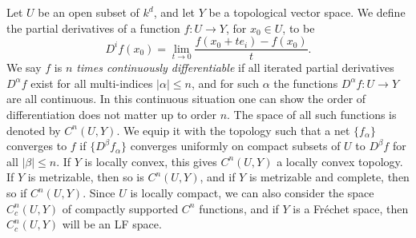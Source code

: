 Let $U$ be an open subset of $k^d$, and let $Y$ be a topological vector space. We define the partial derivatives of a function $f: U \to Y$, for $x_0 \in U$, to be
%
\[ D^i f(x_0) = \lim_{t \to 0} \frac{f(x_0 + t e_i) - f(x_0)}{t}. \]
%
We say $f$ is \emph{$n$ times continuously differentiable} if all iterated partial derivatives $D^\alpha f$ exist for all multi-indices $|\alpha| \leq n$, and for such $\alpha$ the functions $D^\alpha f: U \to Y$ are all continuous. In this continuous situation one can show the order of differentiation does not matter up to order $n$. The space of all such functions is denoted by $C^n(U,Y)$. We equip it with the topology such that a net $\{ f_\alpha \}$ converges to $f$ if $\{ D^\beta f_\alpha \}$ converges uniformly on compact subsets of $U$ to $D^\beta f$ for all $|\beta| \leq n$. If $Y$ is locally convex, this gives $C^n(U,Y)$ a locally convex topology. If $Y$ is metrizable, then so is $C^n(U,Y)$, and if $Y$ is metrizable and complete, then so if $C^n(U,Y)$. Since $U$ is locally compact, we can also consider the space $C^n_c(U,Y)$ of compactly supported $C^n$ functions, and if $Y$ is a Fr\'{e}chet space, then $C^n_c(U,Y)$ will be an LF space.

